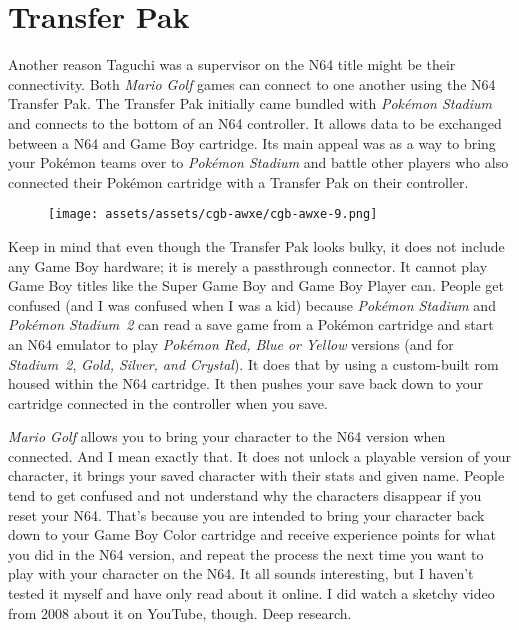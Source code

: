 \documentclass{book}
\begin{document}
\FloatBarrier\needspace{10mm}\section*{Transfer Pak}\nopagebreak[4]

Another reason Taguchi was a supervisor on the N64 title might be their connectivity. Both \emph{Mario Golf} games can connect to one another using the N64 Transfer Pak. The Transfer Pak initially came bundled with \emph{Pokémon Stadium} and connects to the bottom of an N64 controller. It allows data to be exchanged between a N64 and Game Boy cartridge. Its main appeal was as a way to bring your Pokémon teams over to \emph{Pokémon Stadium} and battle other players who also connected their Pokémon cartridge with a Transfer Pak on their controller.

\begin{figure}[hbt]
\vskip 10pt
\centering \texttt{[image: assets/assets/cgb-awxe/cgb-awxe-9.png]}
\vskip 6pt
\end{figure}

Keep in mind that even though the Transfer Pak looks bulky, it does not include any Game Boy hardware; it is merely a passthrough connector. It cannot play Game Boy titles like the Super Game Boy and Game Boy Player can. People get confused (and I was confused when I was a kid) because \emph{Pokémon Stadium} and \emph{Pokémon Stadium 2} can read a save game from a Pokémon cartridge and start an N64 emulator to play \emph{Pokémon Red, Blue or Yellow} versions (and for \emph{Stadium 2}, \emph{Gold, Silver, and Crystal}). It does that by using a custom-built rom housed within the N64 cartridge. It then pushes your save back down to your cartridge connected in the controller when you save.

\emph{Mario Golf} allows you to bring your character to the N64 version when connected. And I mean exactly that. It does not unlock a playable version of your character, it brings your saved character with their stats and given name. People tend to get confused and not understand why the characters disappear if you reset your N64. That’s because you are intended to bring your character back down to your Game Boy Color cartridge and receive experience points for what you did in the N64 version, and repeat the process the next time you want to play with your character on the N64. It all sounds interesting, but I haven’t tested it myself and have only read about it online. I did watch a sketchy video from 2008 about it on YouTube, though. Deep research.
\end{document}
